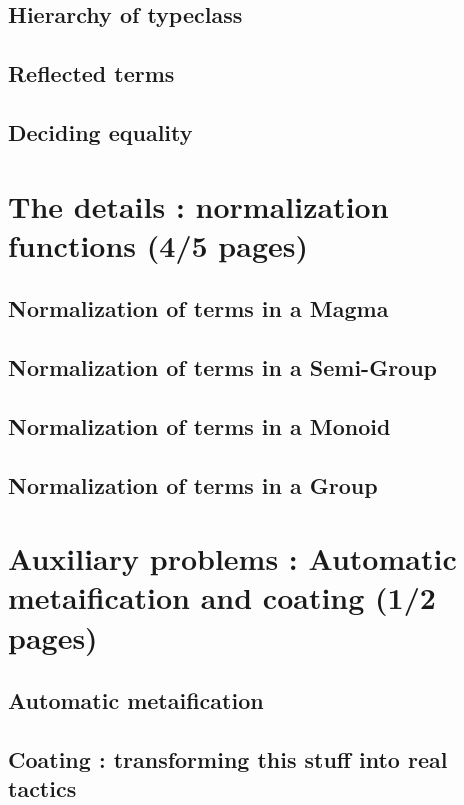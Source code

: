 \documentclass{sigplanconf}
\begin{document}
	\subsection {Hierarchy of typeclass}

	\subsection {Reflected terms}

	\subsection {Deciding equality}

\section {The details : normalization functions (4/5 pages)}

	\subsection {Normalization of terms in a Magma}

	\subsection {Normalization of terms in a Semi-Group}

	\subsection {Normalization of terms in a Monoid}

	\subsection {Normalization of terms in a Group}

\section {Auxiliary problems : Automatic metaification and coating (1/2 pages)}

	\subsection {Automatic metaification}

	\subsection {Coating : transforming this stuff into real tactics}
\end{document}

